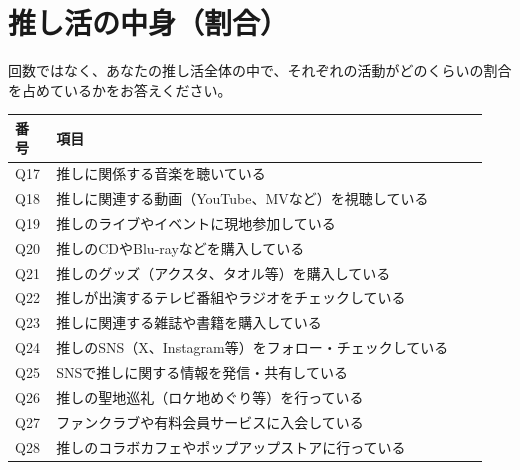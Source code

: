 \section*{推し活の中身（割合）}
\noindent 回数ではなく、あなたの推し活全体の中で、それぞれの活動がどのくらいの割合を占めているかをお答えください。\\
\begin{longtable}{@{}p{0.08\linewidth}p{0.86\linewidth}@{}}
\toprule 番号 & 項目 \\ \midrule \endhead \bottomrule \endfoot
Q17 & 推しに関係する音楽を聴いている \\
Q18 & 推しに関連する動画（YouTube、MVなど）を視聴している \\
Q19 & 推しのライブやイベントに現地参加している \\
Q20 & 推しのCDやBlu-rayなどを購入している \\
Q21 & 推しのグッズ（アクスタ、タオル等）を購入している \\
Q22 & 推しが出演するテレビ番組やラジオをチェックしている \\
Q23 & 推しに関連する雑誌や書籍を購入している \\
Q24 & 推しのSNS（X、Instagram等）をフォロー・チェックしている \\
Q25 & SNSで推しに関する情報を発信・共有している \\
Q26 & 推しの聖地巡礼（ロケ地めぐり等）を行っている \\
Q27 & ファンクラブや有料会員サービスに入会している \\
Q28 & 推しのコラボカフェやポップアップストアに行っている \\
\end{longtable}
